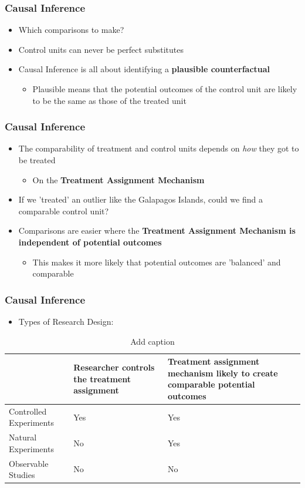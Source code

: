 \documentclass[xcolor=x11names,compress]{beamer}\usepackage[]{graphicx}\usepackage[]{color}
\renewcommand{\(}{\begin{columns}}
\renewcommand{\)}{\end{columns}}
\newcommand{\<}[1]{\begin{column}{#1}}
\renewcommand{\>}{\end{column}}
\begin{document}
\begin{frame}
\frametitle{Causal Inference}
\begin{itemize}
\item Which comparisons to make? 
\item Control units can never be perfect substitutes
\item Causal Inference is all about identifying a \textbf{plausible counterfactual}
\begin{itemize}
\item Plausible means that the potential outcomes of the control unit are likely to be the same as those of the treated unit
\end{itemize}
\end{itemize}
\end{frame}

\begin{frame}
\frametitle{Causal Inference}
\begin{itemize}
\item The comparability of treatment and control units depends on \textit{how} they got to be treated
\begin{itemize}
\item On the \textbf{Treatment Assignment Mechanism}
\end{itemize}
\item If we 'treated' an outlier like the Galapagos Islands, could we find a comparable control unit?
\item Comparisons are easier where the \textbf{Treatment Assignment Mechanism is independent of potential outcomes}
\begin{itemize}
\item This makes it more likely that potential outcomes are 'balanced' and comparable
\end{itemize}
\end{itemize}
\end{frame}

\begin{frame}
\frametitle{Causal Inference}
\begin{itemize}
\item Types of Research Design:
\end{itemize}
\begin{table}[htbp]
  \centering
  \caption{Add caption}
    \begin{tabular}{|>{\raggedright}p{5cm}|p{5cm}|p{5cm}|}
    \toprule
          & Researcher controls the treatment assignment & Treatment assignment mechanism likely to create comparable potential outcomes \\
    \midrule
    Controlled Experiments & Yes   & Yes \\
    \midrule
    Natural Experiments & No    & Yes \\
    \midrule
    Observable Studies & No    & No \\
    \bottomrule
    \end{tabular}%
  \label{tab:addlabel}%
\end{table}%
\end{frame}
\end{document}
